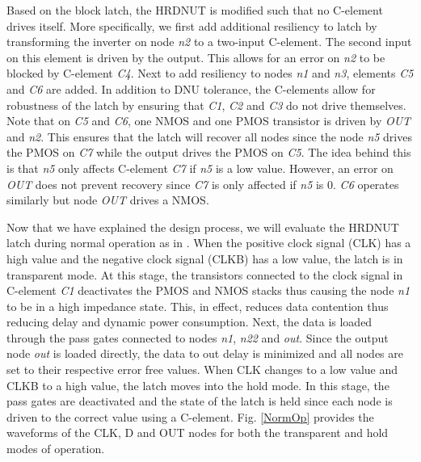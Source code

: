 Based on the block latch, the HRDNUT is modified such that no C-element drives itself. More specifically, we first add additional resiliency to latch by transforming the inverter on node \textit{n2} to a two-input C-element. The second input on this element is driven by the output. This allows for an error on \textit{n2} to be blocked by C-element \textit{C4}. Next to add resiliency to nodes \textit{n1} and \textit{n3}, elements \textit{C5} and \textit{C6} are added. In addition to DNU tolerance, the C-elements allow for robustness of the latch by ensuring that \textit{C1}, \textit{C2} and \textit{C3} do not drive themselves. Note that on \textit{C5} and \textit{C6}, one NMOS and one PMOS transistor is driven by \textit{OUT} and \textit{n2}. This ensures that the latch will recover all nodes since the node \textit{n5} drives the PMOS on \textit{C7} while the output drives the PMOS  on \textit{C5}. The idea behind this is that \textit{n5} only affects C-element \textit{C7} if \textit{n5} is a low value. However, an error on \textit{OUT} does not prevent recovery since \textit{C7} is only affected if \textit{n5} is 0. \textit{C6} operates similarly but node \textit{OUT} drives a NMOS.

Now that we have explained the design process, we will evaluate the HRDNUT latch during normal operation as in \cite{Watkins2016}. When the positive clock signal (CLK) has a high value and the negative clock signal (CLKB) has a low value, the latch is in transparent mode. At this stage, the transistors connected to the clock signal in C-element \textit{C1} deactivates the PMOS and NMOS stacks thus causing the node \textit{n1} to be in a high impedance state. This, in effect, reduces data contention thus reducing delay and dynamic power consumption. Next, the data is loaded through the pass gates connected to nodes \textit{n1}, \textit{n22} and \textit{out}. Since the output node \textit{out} is loaded directly, the data to out delay is minimized and all nodes are set to their respective error free values. When CLK changes to a low value and CLKB to a high value, the latch moves into the hold mode. In this stage, the pass gates are deactivated and the state of the latch is held since each node is driven to the correct value using a C-element. Fig. \ref{NormOp} provides the waveforms of the CLK, D and OUT nodes for both the transparent and hold modes of operation.

